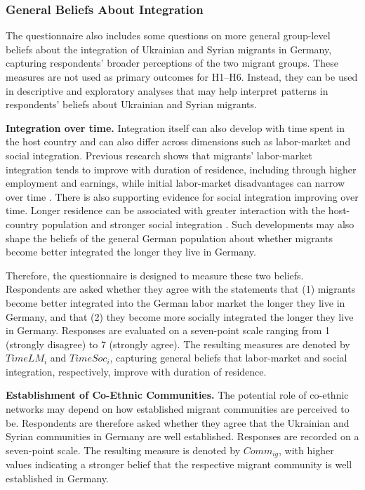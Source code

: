 \subsubsection{General Beliefs About Integration}
The questionnaire also includes some questions on more general group-level beliefs about the integration of Ukrainian and Syrian 
migrants in Germany, capturing respondents' broader perceptions of the two migrant groups. These measures are not used 
as primary outcomes for H1–H6. Instead, they can be used in descriptive and exploratory analyses that may help 
interpret patterns in respondents’ beliefs about Ukrainian and Syrian migrants.\bigskip 

\noindent\textbf{Integration over time.} Integration itself can also develop with time spent in the host country and 
can also differ across dimensions such as labor-market and social integration.
Previous research shows that migrants' labor-market integration tends to improve with duration of residence, including 
through higher employment and earnings, while initial labor-market disadvantages can narrow over time 
\citep{brucker2020funf,fasani2022struggle}. There is also supporting evidence for social integration improving over time. 
Longer residence can be associated with greater interaction with the host-country population and stronger social 
integration \citep{niehues2021spracherwerb, hannafi2023social}. Such developments may also shape the beliefs of 
the general German population about whether migrants become better integrated the longer they live in Germany. 

Therefore, the questionnaire is designed to measure these two beliefs. Respondents are asked whether they agree 
with the statements that (1) migrants become better integrated into the German labor market the longer they live in Germany,
and that (2) they become more socially integrated the longer they live in Germany. Responses are 
evaluated on a seven-point scale ranging from 1 (strongly disagree) to 7 (strongly agree). The resulting measures are 
denoted by \(TimeLM_i\) and \(TimeSoc_i\), capturing general beliefs that labor-market and social integration, respectively, 
improve with duration of residence.\bigskip

\noindent\textbf{Establishment of Co-Ethnic Communities.} The potential role of co-ethnic networks may depend 
on how established migrant communities are perceived to be. Respondents are therefore asked whether they agree
that the Ukrainian and Syrian communities in Germany are well established. Responses are recorded on a seven-point scale. 
The resulting measure is denoted by \(Comm_{ig}\), with higher values indicating a stronger belief that the respective 
migrant community is well established in Germany. \bigskip

